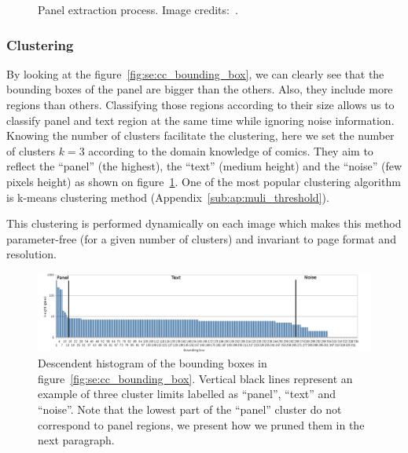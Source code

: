 \begin{figure}[!ht]
		  \caption[Panel extraction process]{Panel extraction process. Image credits:~\cite{Bubble09}.}
	\end{figure}




\subsubsection{Clustering} %
\label{par:clustering}
By looking at the figure~\ref{fig:se:cc_bounding_box}, we can clearly see that the bounding boxes of the panel are bigger than the others.
Also, they include more regions than others.
Classifying those regions according to their size allows us to classify panel and text region at the same time while ignoring noise information.
Knowing the number of clusters facilitate the clustering, here 
we set the number of clusters $k=3$ according to the domain knowledge of comics.
They aim to reflect the ``panel'' (the highest), the ``text'' (medium height) and the ``noise'' (few pixels height) as shown on figure~\ref{fig:se:histo_roi}.
One of the most popular clustering algorithm is k-means clustering method (Appendix~\ref{sub:ap:muli_threshold}).


This clustering is performed dynamically on each image which makes this method parameter-free (for a given number of clusters) and invariant to page format and resolution.

	\begin{figure}[!ht]	%
	  \centering
		\includegraphics[trim= 5mm 0mm 10mm 0mm, clip,width=1.0\textwidth]{Histogram_en.png}
		\caption[Descendant histogram of the connected component bounding box heights]{Descendent histogram of the bounding boxes in figure~\ref{fig:se:cc_bounding_box}. Vertical black lines represent an example of three cluster limits labelled as ``panel'', ``text'' and ``noise''. Note that the lowest part of the ``panel'' cluster do not correspond to panel regions, we present how we pruned them in the next paragraph.}
		\label{fig:se:histo_roi}
	\end{figure}

